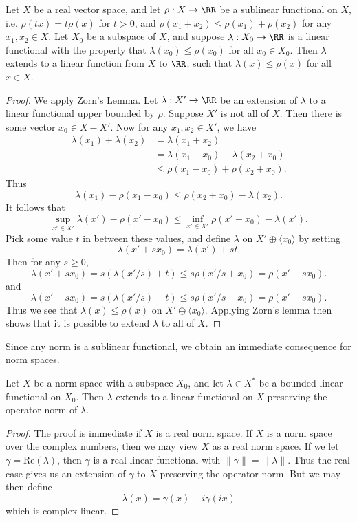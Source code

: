 \begin{theorem}
    Let $X$ be a real vector space, and let $\rho: X \to \RR$ be a sublinear functional on $X$, i.e. $\rho(tx) = t \rho(x)$ for $t > 0$, and $\rho(x_1 + x_2) \leq \rho(x_1) + \rho(x_2)$ for any $x_1,x_2 \in X$. Let $X_0$ be a subspace of $X$, and suppose $\lambda: X_0 \to \RR$ is a linear functional with the property that $\lambda(x_0) \leq \rho(x_0)$ for all $x_0 \in X_0$. Then $\lambda$ extends to a linear function from $X$ to $\RR$, such that $\lambda(x) \leq \rho(x)$ for all $x \in X$.
\end{theorem}
\begin{proof}
    We apply Zorn's Lemma. Let $\lambda: X' \to \RR$ be an extension of $\lambda$ to a linear functional upper bounded by $\rho$. Suppose $X'$ is not all of $X$. Then there is some vector $x_0 \in X - X'$. Now for any $x_1,x_2 \in X'$, we have
    \begin{align*}
        \lambda(x_1) + \lambda(x_2) &= \lambda(x_1 + x_2)\\
        &= \lambda(x_1 - x_0) + \lambda(x_2 + x_0)\\
        &\leq \rho(x_1 - x_0) + \rho(x_2 + x_0).
    \end{align*}
    Thus
    \[ \lambda(x_1) - \rho(x_1 - x_0) \leq \rho(x_2 + x_0) - \lambda(x_2). \]
    It follows that
    \[ \sup_{x' \in X'} \lambda(x') - \rho(x' - x_0) \leq \inf_{x' \in X'} \rho(x' + x_0) - \lambda(x'). \]
    Pick some value $t$ in between these values, and define $\lambda$ on $X' \oplus \langle x_0 \rangle$ by setting
    \[ \lambda(x' + sx_0) = \lambda(x') + st. \]
    Then for any $s \geq 0$,
    \[ \lambda(x' + sx_0) = s(\lambda(x'/s) + t) \leq s \rho(x'/s + x_0) = \rho(x' + sx_0). \]
    and
    \[ \lambda(x' - sx_0) = s(\lambda(x'/s) - t) \leq s \rho(x'/s - x_0) = \rho(x' - sx_0). \]
    Thus we see that $\lambda(x) \leq \rho(x)$ on $X' \oplus \langle x_0 \rangle$. Applying Zorn's lemma then shows that it is possible to extend $\lambda$ to all of $X$.
\end{proof}

Since any norm is a sublinear functional, we obtain an immediate consequence for norm spaces.

\begin{corollary}
    Let $X$ be a norm space with a subspace $X_0$, and let $\lambda \in X^*$ be a bounded linear functional on $X_0$. Then $\lambda$ extends to a linear functional on $X$ preserving the operator norm of $\lambda$.
\end{corollary}
\begin{proof}
    The proof is immediate if $X$ is a real norm space. If $X$ is a norm space over the complex numbers, then we may view $X$ as a real norm space. If we let $\gamma = \text{Re}(\lambda)$, then $\gamma$ is a real linear functional with $\| \gamma \| = \| \lambda \|$. Thus the real case gives us an extension of $\gamma$ to $X$ preserving the operator norm. But we may then define
    \[ \lambda(x) = \gamma(x) - i \gamma(ix) \]
    which is complex linear.
\end{proof}

